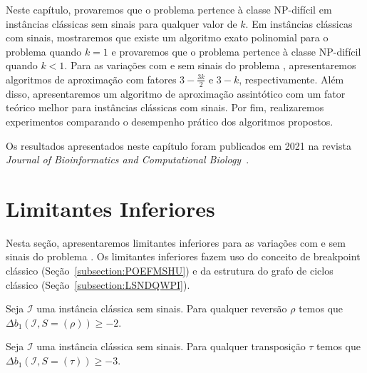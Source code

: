 Neste capítulo, provaremos que o problema \SbPRT{} pertence à classe NP-difícil em instâncias clássicas sem sinais para qualquer valor de $k$. Em instâncias clássicas com sinais, mostraremos que existe um algoritmo exato polinomial para o problema quando $k=1$ e provaremos que o problema pertence à classe NP-difícil quando $k < 1$. Para as variações com e sem sinais do problema \SbPRT{}, apresentaremos algoritmos de aproximação com fatores $3 - \frac{3k}{2}$ e $3-k$, respectivamente. Além disso, apresentaremos um algoritmo de aproximação assintótico com um fator teórico melhor para instâncias clássicas com sinais. Por fim, realizaremos experimentos comparando o desempenho prático dos algoritmos propostos.

Os resultados apresentados neste capítulo foram publicados em 2021 na revista \emph{Journal of Bioinformatics and Computational Biology}~\cite{2021a-brito-etal}.

\section{Limitantes Inferiores}

Nesta seção, apresentaremos limitantes inferiores para as variações com e sem sinais do problema \SbPRT{}. Os limitantes inferiores fazem uso do conceito de breakpoint clássico (Seção~\ref{subsection:POEFMSHU}) e da estrutura do grafo de ciclos clássico (Seção~\ref{subsection:LSNDQWPI}).

\begin{lemma}\label{lemma:QIRAVPQT}
Seja $\mathcal{I}$ uma instância clássica sem sinais. Para qualquer reversão $\rho$ temos que $\Delta b_1(\mathcal{I}, S = (\rho)) \ge -2$.
\end{lemma}

\begin{lemma}\label{lemma:NJATEDCC}
Seja $\mathcal{I}$ uma instância clássica sem sinais. Para qualquer transposição $\tau$ temos que $\Delta b_1(\mathcal{I}, S = (\tau)) \ge -3$.
\end{lemma}

